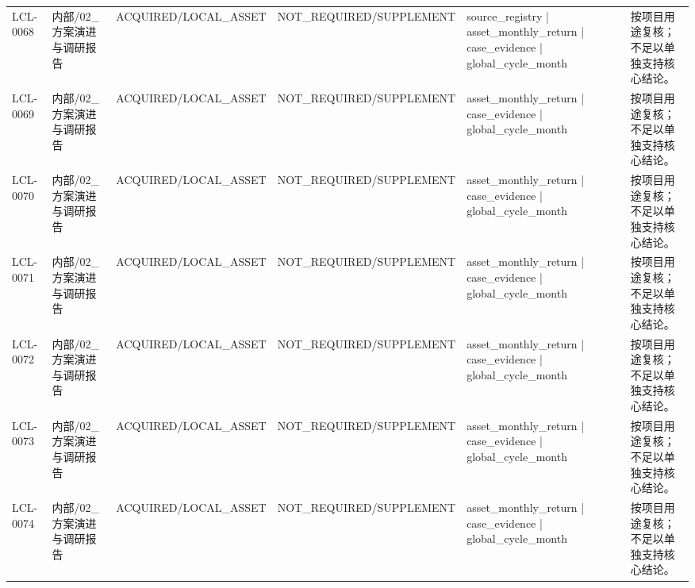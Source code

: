 \begin{landscape}
\begin{longtable}{p{1.8cm}p{2.6cm}p{2.6cm}p{2.6cm}p{4.8cm}p{7.2cm}}
LCL-0068 & 内部/\allowbreak{}02\_\allowbreak{}方案演进与调研报告 & ACQUIRED/\allowbreak{}LOCAL\_\allowbreak{}ASSET & NOT\_\allowbreak{}REQUIRED/\allowbreak{}SUPPLEMENT & source\_\allowbreak{}registry | asset\_\allowbreak{}monthly\_\allowbreak{}return | case\_\allowbreak{}evidence | global\_\allowbreak{}cycle\_\allowbreak{}month & 按项目用途复核；不足以单独支持核心结论。\\
LCL-0069 & 内部/\allowbreak{}02\_\allowbreak{}方案演进与调研报告 & ACQUIRED/\allowbreak{}LOCAL\_\allowbreak{}ASSET & NOT\_\allowbreak{}REQUIRED/\allowbreak{}SUPPLEMENT & asset\_\allowbreak{}monthly\_\allowbreak{}return | case\_\allowbreak{}evidence | global\_\allowbreak{}cycle\_\allowbreak{}month & 按项目用途复核；不足以单独支持核心结论。\\
LCL-0070 & 内部/\allowbreak{}02\_\allowbreak{}方案演进与调研报告 & ACQUIRED/\allowbreak{}LOCAL\_\allowbreak{}ASSET & NOT\_\allowbreak{}REQUIRED/\allowbreak{}SUPPLEMENT & asset\_\allowbreak{}monthly\_\allowbreak{}return | case\_\allowbreak{}evidence | global\_\allowbreak{}cycle\_\allowbreak{}month & 按项目用途复核；不足以单独支持核心结论。\\
LCL-0071 & 内部/\allowbreak{}02\_\allowbreak{}方案演进与调研报告 & ACQUIRED/\allowbreak{}LOCAL\_\allowbreak{}ASSET & NOT\_\allowbreak{}REQUIRED/\allowbreak{}SUPPLEMENT & asset\_\allowbreak{}monthly\_\allowbreak{}return | case\_\allowbreak{}evidence | global\_\allowbreak{}cycle\_\allowbreak{}month & 按项目用途复核；不足以单独支持核心结论。\\
LCL-0072 & 内部/\allowbreak{}02\_\allowbreak{}方案演进与调研报告 & ACQUIRED/\allowbreak{}LOCAL\_\allowbreak{}ASSET & NOT\_\allowbreak{}REQUIRED/\allowbreak{}SUPPLEMENT & asset\_\allowbreak{}monthly\_\allowbreak{}return | case\_\allowbreak{}evidence | global\_\allowbreak{}cycle\_\allowbreak{}month & 按项目用途复核；不足以单独支持核心结论。\\
LCL-0073 & 内部/\allowbreak{}02\_\allowbreak{}方案演进与调研报告 & ACQUIRED/\allowbreak{}LOCAL\_\allowbreak{}ASSET & NOT\_\allowbreak{}REQUIRED/\allowbreak{}SUPPLEMENT & asset\_\allowbreak{}monthly\_\allowbreak{}return | case\_\allowbreak{}evidence | global\_\allowbreak{}cycle\_\allowbreak{}month & 按项目用途复核；不足以单独支持核心结论。\\
LCL-0074 & 内部/\allowbreak{}02\_\allowbreak{}方案演进与调研报告 & ACQUIRED/\allowbreak{}LOCAL\_\allowbreak{}ASSET & NOT\_\allowbreak{}REQUIRED/\allowbreak{}SUPPLEMENT & asset\_\allowbreak{}monthly\_\allowbreak{}return | case\_\allowbreak{}evidence | global\_\allowbreak{}cycle\_\allowbreak{}month & 按项目用途复核；不足以单独支持核心结论。\\

\end{longtable}
\end{landscape}
